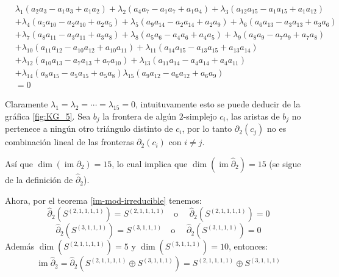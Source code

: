 \documentclass[12pt]{book}
\theoremstyle{definition}
\DeclareMathOperator{\im}{im}
\newcounter{in}
\newcounter{ini}
\begin{document}
  



\begin{footnotesize}
  \begin{align*}
    &\lambda_{1}(a_{2}a_{3}-a_{1}a_{3}+a_{1}a_{2})+\lambda_{2}(a_{4}a_{7}-a_{1}a_{7}+a_{1}a_{4})+\lambda_{3}(a_{12}a_{15}-a_{1}a_{15}+a_{1}a_{12})\\
    &+\lambda_{4}(a_{5}a_{10}-a_{2}a_{10}+a_{2}a_{5})+\lambda_{5}(a_{9}a_{14}-a_{2}a_{14}+a_{2}a_{9})+\lambda_{6}(a_{6}a_{13}-a_{3}a_{13}+a_{3}a_{6})\\
    &+\lambda_{7}(a_{8}a_{11}-a_{3}a_{11}+a_{3}a_{8})+\lambda_{8}(a_{5}a_{6}-a_{4}a_{6}+a_{4}a_{5})+\lambda_{9}(a_{8}a_{9}-a_{7}a_{9}+a_{7}a_{8})\\
    &+\lambda_{10}(a_{11}a_{12}-a_{10}a_{12}+a_{10}a_{11})+\lambda_{11}(a_{14}a_{15}-a_{13}a_{15}+a_{13}a_{14})\\
    &+\lambda_{12}(a_{10}a_{13}-a_{7}a_{13}+a_{7}a_{10})+\lambda_{13}(a_{11}a_{14}-a_{4}a_{14}+a_{4}a_{11})\\
    &+\lambda_{14}(a_{8}a_{15}-a_{5}a_{15}+a_{5}a_{8})\lambda_{15}(a_{9}a_{12}-a_{6}a_{12}+a_{6}a_{9})\\
    &=0
  \end{align*}
\end{footnotesize}


Claramente $\lambda_{1}=\lambda_{2}=\cdots=\lambda_{15}=0$,
intuituvamente esto se puede deducir de la gráfica \ref{fig:KG_5}.
Sea $b_{j}$ la frontera de algún $2$-simplejo $c_{i}$, las aristas
de $b_{j}$ no pertenece a ningún otro triángulo distinto de $c_{i}$, por
lo tanto $\partial_{2}(c_{j})$ no es combinación lineal de las fronteras
$\partial_{2}(c_{i})$ con $i\neq j$.

Así que $\dim(\im\partial_{2})=15$, lo cual implica que
$\dim(\im\widehat\partial_{2})=15$ (se sigue de la definición de
$\widehat\partial_{2}$).

Ahora, por el teorema \ref{im-mod-irreducible} tenemos:
  $$\widehat\partial_{2}(S^{(2,1,1,1,1)})=S^{(2,1,1,1,1)} \quad \mbox{o }\quad \widehat\partial_{2}(S^{(2,1,1,1,1)})=0$$
  $$\widehat\partial_{2}(S^{(3,1,1,1)})=S^{(3,1,1,1)} \quad \mbox{o }\quad \widehat\partial_{2}(S^{(3,1,1,1)})=0$$
Además $\dim(S^{(2,1,1,1,1)})=5$ y $\dim(S^{(3,1,1,1)})=10$, entonces:
$$\im\widehat\partial_{2}=\widehat\partial_{2}(S^{(2,1,1,1,1)}\oplus S^{(3,1,1,1)})=S^{(2,1,1,1,1)}\oplus S^{(3,1,1,1)}$$




\printindex
\end{document}
